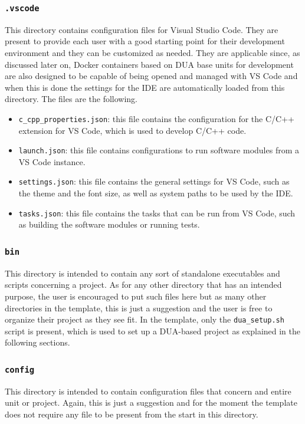 \subsubsection{\texttt{.vscode}}
\label{sec:dua_template_layout_vscode}
This directory contains configuration files for Visual Studio Code. They are present to provide each user with a good starting point for their development environment and they can be customized as needed. They are applicable since, as discussed later on, Docker containers based on DUA base units for development are also designed to be capable of being opened and managed with VS Code and when this is done the settings for the IDE are automatically loaded from this directory. The files are the following.
\begin{itemize}
  \item \texttt{c\_cpp\_properties.json}: this file contains the configuration for the C/C++ extension for VS Code, which is used to develop C/C++ code.
  \item \texttt{launch.json}: this file contains configurations to run software modules from a VS Code instance.
  \item \texttt{settings.json}: this file contains the general settings for VS Code, such as the theme and the font size, as well as system paths to be used by the IDE.
  \item \texttt{tasks.json}: this file contains the tasks that can be run from VS Code, such as building the software modules or running tests.
\end{itemize}

\subsubsection{\texttt{bin}}
\label{sec:dua_template_layout_bin}
This directory is intended to contain any sort of standalone executables and scripts concerning a project. As for any other directory that has an intended purpose, the user is encouraged to put such files here but as many other directories in the template, this is just a suggestion and the user is free to organize their project as they see fit. In the template, only the \texttt{dua\_setup.sh} script is present, which is used to set up a DUA-based project as explained in the following sections.

\subsubsection{\texttt{config}}
\label{sec:dua_template_layout_config}
This directory is intended to contain configuration files that concern and entire unit or project. Again, this is just a suggestion and for the moment the template does not require any file to be present from the start in this directory.

